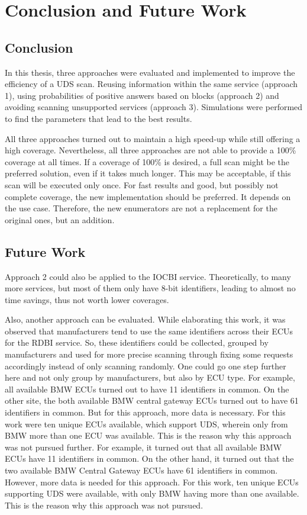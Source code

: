 \section{Conclusion and Future Work}

\subsection{Conclusion}

In this thesis, three approaches were evaluated and implemented to improve the efficiency of a UDS scan. Reusing information within the same service (approach 1), using probabilities of positive answers based on blocks (approach 2) and avoiding scanning unsupported services (approach 3). Simulations were performed to find the parameters that lead to the best results.

All three approaches turned out to maintain a high speed-up while still offering a high coverage.
Nevertheless, all three approaches are not able to provide a 100\% coverage at all times. 
If a coverage of 100\% is desired, a full scan might be the preferred solution, even if it takes much longer. This may be acceptable, if this scan will be executed only once. For fast results and good, but possibly not complete coverage, the new implementation should be preferred. It depends on the use case. Therefore, the new enumerators are not a replacement for the original ones, but an addition.

\subsection{Future Work}

Approach 2 could also be applied to the IOCBI service. Theoretically, to many more services, but most of them only have 8-bit identifiers, leading to almost no time savings, thus not worth lower coverages.

Also, another approach can be evaluated. While elaborating this work, it was observed that manufacturers tend to use the same identifiers across their ECUs for the RDBI service. So, these identifiers could be collected, grouped by manufacturers and used for more precise scanning through fixing some requests accordingly instead of only scanning randomly. One could go one step further here and not only group by manufacturers, but also by ECU type.
For example, all available BMW ECUs turned out to have 11 identifiers in common. On the other site, the both available BMW central gateway ECUs turned out to have 61 identifiers in common. But for this approach, more data is necessary. For this work were ten unique ECUs available, which support UDS, wherein only from BMW more than one ECU was available. This is the reason why this approach was not pursued further.
For example, it turned out that all available BMW ECUs have 11 identifiers in common. On the other hand, it turned out that the two available BMW Central Gateway ECUs have 61 identifiers in common. However, more data is needed for this approach. For this work, ten unique ECUs supporting UDS were available, with only BMW having more than one available. This is the reason why this approach was not pursued.

